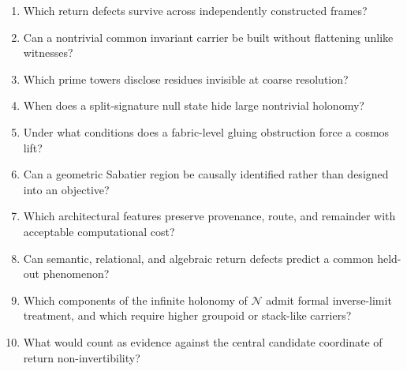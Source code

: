 \documentclass[12pt,openany]{book}
\theoremstyle{remark}
\newcommand{\Nfabric}{\mathcal N}
\begin{document}
\begin{enumerate}
\item Which return defects survive across independently constructed frames?
\item Can a nontrivial common invariant carrier be built without flattening unlike witnesses?
\item Which prime towers disclose residues invisible at coarse resolution?
\item When does a split-signature null state hide large nontrivial holonomy?
\item Under what conditions does a fabric-level gluing obstruction force a cosmos lift?
\item Can a geometric Sabatier region be causally identified rather than designed into an objective?
\item Which architectural features preserve provenance, route, and remainder with acceptable computational cost?
\item Can semantic, relational, and algebraic return defects predict a common held-out phenomenon?
\item Which components of the infinite holonomy of $\Nfabric$ admit formal inverse-limit treatment, and which require higher groupoid or stack-like carriers?
\item What would count as evidence against the central candidate coordinate of return non-invertibility?
\end{enumerate}

\backmatter
\end{document}
